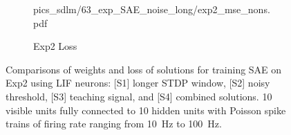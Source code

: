 \begin{figure}
\begin{subfigure}[c]{0.48\textwidth}
{			{pics_sdlm/63_exp_SAE_noise_long/exp2_mse_nons.pdf}}
		\\
		\caption{Exp2 Loss}
	\end{subfigure}%
	\caption[Comparisons of solutions in training SAE using LIF.]{Comparisons of weights and loss of solutions for training SAE on Exp2 using LIF neurons: [S1] longer STDP window, [S2] noisy threshold, [S3] teaching signal, and [S4] combined solutions. 10 visible units fully connected to 10 hidden units with Poisson spike trains of firing rate ranging from 10~Hz to 100~Hz.}
	\label{fig:LIF_sae}
\end{figure}

